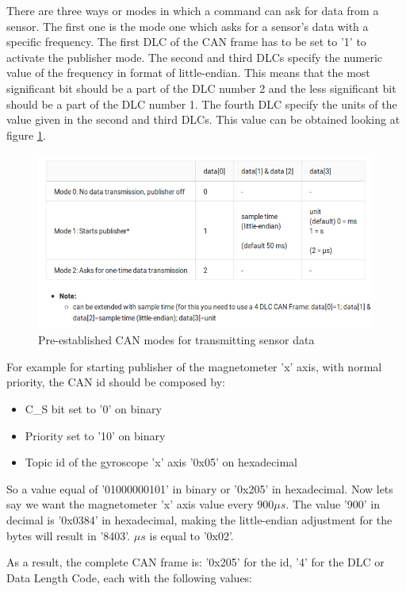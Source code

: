 \documentclass[12pt]{report}%
\begin{document}
There are three ways or modes in which a command can ask for data from a sensor. The first one is the mode one which asks for a sensor's data with a specific frequency. The first DLC of the CAN frame has to be set to '1' to activate the publisher mode. The second and third DLCs specify the numeric value of the frequency in format of little-endian. This means that the most significant bit should be a part of the DLC number 2 and the less significant bit should be a part of the DLC number 1. The fourth DLC specify the units of the value given in the second and third DLCs. This value can be obtained looking at figure \ref{fig:sensormodes}.

\begin{figure}[ht]
	\centering
	\includegraphics[width=\textwidth]{modes}
    \caption{Pre-established CAN modes for transmitting sensor data \cite{DAEbot_Wiki}}
    \label{fig:sensormodes}
\end{figure}

For example for starting publisher of the magnetometer 'x' axis, with normal priority, the CAN id should be composed by:
\begin{itemize}
	\item C\_S bit set to '0' on binary
	\item Priority set to '10' on binary
	\item Topic id of the gyroscope 'x' axis '0x05' on hexadecimal
\end{itemize}

So a value equal of '01000000101' in binary or '0x205' in hexadecimal. Now lets say we want the magnetometer 'x' axis value every $900\mu s$. The value '900' in decimal is '0x0384' in hexadecimal, making the little-endian adjustment for the bytes will result in '8403'. $\mu s$ is equal to '0x02'.

As a result, the complete CAN frame is: '0x205' for the id, '4' for the DLC or Data Length Code, each with the following values:
\end{document}
